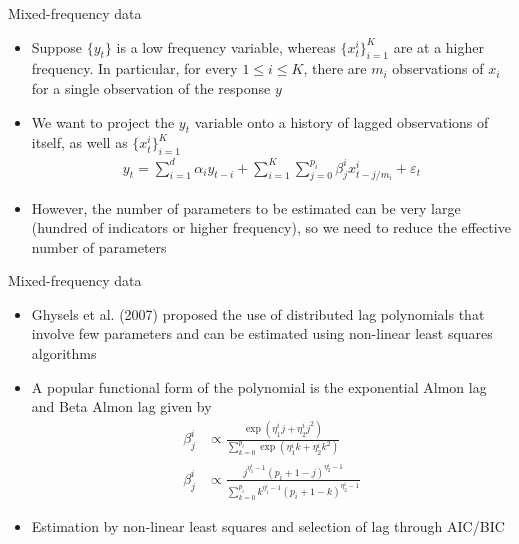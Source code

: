 \documentclass{beamer}
\begin{document}
\begin{frame}{Mixed-frequency data}
    \begin{itemize}
        
        \item Suppose $\{y_t\}$ is a low frequency variable, whereas $\{x_t^i\}_{i=1}^K$ are at a higher frequency. In particular, for every $1 \leq i \leq K$, there are $m_i$ observations of $x_i$ for a single observation of the response $y$

        \item We want to project the $y_t$ variable onto a history of lagged observations of itself, as well as $\{x_t^i\}_{i=1}^K$
        \begin{align*}
            y_t = \sum_{i=1}^d \alpha_i y_{t-i} + \sum_{i=1}^K \sum_{j=0}^{p_i} \beta_j^i x_{t-j/m_i}^i + \varepsilon_t
        \end{align*}

        \item However, the number of parameters to be estimated can be very large (hundred of indicators or higher frequency), so we need to reduce the effective number of parameters
    \end{itemize}
\end{frame}

\begin{frame}{Mixed-frequency data}
    \begin{itemize}
        \item Ghysels et al. (2007) proposed the use of distributed lag polynomials that involve few parameters and can be estimated using non-linear least squares algorithms

        \item A popular functional form of the polynomial is the exponential Almon lag and Beta Almon lag given by
        \begin{align*}
            \beta_j^i &\propto \frac{\exp(\eta_1^i j + \eta_2^i j^2)}{\sum_{k=0}^{p_i}\exp(\eta_1^i k + \eta_2^i k^2)}\\
            \beta_j^i &\propto \frac{j^{\eta_1^i-1}(p_i+1-j)^{\eta_2^i-1}}{\sum_{k=0}^{p_i} k^{\eta_1^i-1}(p_i+1-k)^{\eta_2^i-1}}
        \end{align*}

        \item Estimation by non-linear least squares and selection of lag through AIC/BIC
    \end{itemize}
\end{frame}
\end{document}
